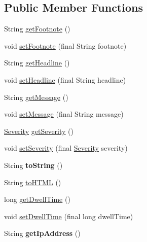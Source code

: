 \subsection*{Public Member Functions}
\begin{DoxyCompactItemize}
\item 
String \hyperlink{classgov_1_1fnal_1_1ppd_1_1dd_1_1emergency_1_1EmergencyMessage_acfba258c7a1ca417cd3e2b6a34962307}{get\-Footnote} ()
\item 
void \hyperlink{classgov_1_1fnal_1_1ppd_1_1dd_1_1emergency_1_1EmergencyMessage_a4fe3dd4efe7785fb96a20cc5ec876a14}{set\-Footnote} (final String footnote)
\item 
String \hyperlink{classgov_1_1fnal_1_1ppd_1_1dd_1_1emergency_1_1EmergencyMessage_aac57716c9b712f118b942fd3edf09b2e}{get\-Headline} ()
\item 
void \hyperlink{classgov_1_1fnal_1_1ppd_1_1dd_1_1emergency_1_1EmergencyMessage_aaa15b556a2f1b9bae865230c771bdfca}{set\-Headline} (final String headline)
\item 
String \hyperlink{classgov_1_1fnal_1_1ppd_1_1dd_1_1emergency_1_1EmergencyMessage_ac1a09c2b7982ceee596fe5c7a637cd83}{get\-Message} ()
\item 
void \hyperlink{classgov_1_1fnal_1_1ppd_1_1dd_1_1emergency_1_1EmergencyMessage_a11593c234d3c53ab05709bb39b89393b}{set\-Message} (final String message)
\item 
\hyperlink{enumgov_1_1fnal_1_1ppd_1_1dd_1_1emergency_1_1Severity}{Severity} \hyperlink{classgov_1_1fnal_1_1ppd_1_1dd_1_1emergency_1_1EmergencyMessage_acd066bcf80d0687b20e73b1d6c05956f}{get\-Severity} ()
\item 
void \hyperlink{classgov_1_1fnal_1_1ppd_1_1dd_1_1emergency_1_1EmergencyMessage_ae38b8edb43b3bcfb6994b4d69d51bfb4}{set\-Severity} (final \hyperlink{enumgov_1_1fnal_1_1ppd_1_1dd_1_1emergency_1_1Severity}{Severity} severity)
\item 
\hypertarget{classgov_1_1fnal_1_1ppd_1_1dd_1_1emergency_1_1EmergencyMessage_ad4a6add7f7749222092846233891b2c3}{String {\bfseries to\-String} ()}\label{classgov_1_1fnal_1_1ppd_1_1dd_1_1emergency_1_1EmergencyMessage_ad4a6add7f7749222092846233891b2c3}

\item 
String \hyperlink{classgov_1_1fnal_1_1ppd_1_1dd_1_1emergency_1_1EmergencyMessage_a44a12fafc3c58182f0ab1480ed771df6}{to\-H\-T\-M\-L} ()
\item 
long \hyperlink{classgov_1_1fnal_1_1ppd_1_1dd_1_1emergency_1_1EmergencyMessage_a661ef4b26e005fb488403ec6f6806722}{get\-Dwell\-Time} ()
\item 
void \hyperlink{classgov_1_1fnal_1_1ppd_1_1dd_1_1emergency_1_1EmergencyMessage_ac877c99f00c752b24bf5d8d285c50061}{set\-Dwell\-Time} (final long dwell\-Time)
\item 
\hypertarget{classgov_1_1fnal_1_1ppd_1_1dd_1_1emergency_1_1EmergencyMessage_a86bc2262ea75b867c2ff6e7851179d59}{String {\bfseries get\-Ip\-Address} ()}\label{classgov_1_1fnal_1_1ppd_1_1dd_1_1emergency_1_1EmergencyMessage_a86bc2262ea75b867c2ff6e7851179d59}


\end{DoxyCompactItemize}
